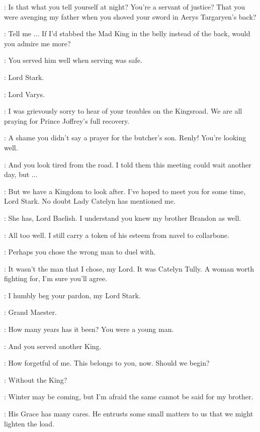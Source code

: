 \NED: Is that what you tell yourself at night? You're a servant of justice? That you were avenging my father when you shoved your sword in Aerys Targaryen's back? 

\JAIME: Tell me $\ldots$ If I'd stabbed the Mad King in the belly instead of the back, would you admire me more? 

\NED: You served him well when serving was safe. 


\VARYS: Lord Stark. 

\NED: Lord Varys. 

\VARYS: I was grievously sorry to hear of your troubles on the Kingsroad. We are all praying for Prince Joffrey's full recovery. 

\NED: A shame you didn't say a prayer for the butcher's son. Renly! You're looking well. 

\RENLY: And you look tired from the road. I told them this meeting could wait another day, but $\ldots$ 

\LITTLEFINGER: But we have a Kingdom to look after. I've hoped to meet you for some time, Lord Stark. No doubt Lady Catelyn has mentioned me. 

\NED: She has, Lord Baelish. I understand you knew my brother Brandon as well. 

\LITTLEFINGER: All too well. I still carry a token of his esteem from navel to collarbone. 

\NED: Perhaps you chose the wrong man to duel with. 

\LITTLEFINGER: It wasn't the man that I chose, my Lord. It was Catelyn Tully. A woman worth fighting for, I'm sure you'll agree. 

\PYCELLE: I humbly beg your pardon, my Lord Stark. 

\NED: Grand Maester. 

\PYCELLE: How many years has it been? You were a young man. 

\NED: And you served another King. 

\PYCELLE: How forgetful of me. This belongs to you, now. Should we begin? 

\NED: Without the King? 

\RENLY: Winter may be coming, but I'm afraid the same cannot be said for my brother. 

\VARYS: His Grace has many cares. He entrusts some small matters to us that we might lighten the load. 

